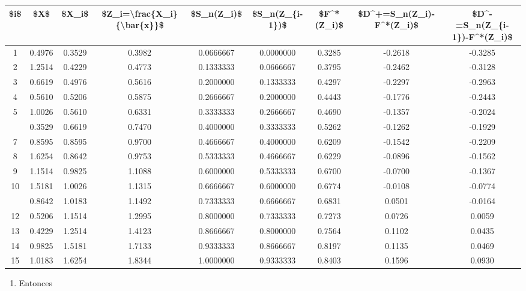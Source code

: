 \documentclass[
  a4paper,
  oneside,
  openany]{book}
\providecommand{\tightlist}{%
  \setlength{\itemsep}{0pt}\setlength{\parskip}{0pt}}
\begin{document}
\begin{table}
\centering
\begin{tabular}{ccccccccc}
\toprule
\$i\$ & \$X\$ & \$X\_i\$ & \$Z\_i=\textbackslash{}frac\{X\_i\}\{\textbackslash{}bar\{x\}\}\$ & \$S\_n(Z\_i)\$ & \$S\_n(Z\_\{i-1\})\$ & \$F\textasciicircum{}*(Z\_i)\$ & \$D\textasciicircum{}+=S\_n(Z\_i)-F\textasciicircum{}*(Z\_i)\$ & \$D\textasciicircum{}-=S\_n(Z\_\{i-1\})-F\textasciicircum{}*(Z\_i)\$\\
\midrule
1 & 0.4976 & 0.3529 & 0.3982 & 0.0666667 & 0.0000000 & 0.3285 & -0.2618 & -0.3285\\
2 & 1.2514 & 0.4229 & 0.4773 & 0.1333333 & 0.0666667 & 0.3795 & -0.2462 & -0.3128\\
3 & 0.6619 & 0.4976 & 0.5616 & 0.2000000 & 0.1333333 & 0.4297 & -0.2297 & -0.2963\\
4 & 0.5610 & 0.5206 & 0.5875 & 0.2666667 & 0.2000000 & 0.4443 & -0.1776 & -0.2443\\
5 & 1.0026 & 0.5610 & 0.6331 & 0.3333333 & 0.2666667 & 0.4690 & -0.1357 & -0.2024\\
\addlinespace
6 & 0.3529 & 0.6619 & 0.7470 & 0.4000000 & 0.3333333 & 0.5262 & -0.1262 & -0.1929\\
7 & 0.8595 & 0.8595 & 0.9700 & 0.4666667 & 0.4000000 & 0.6209 & -0.1542 & -0.2209\\
8 & 1.6254 & 0.8642 & 0.9753 & 0.5333333 & 0.4666667 & 0.6229 & -0.0896 & -0.1562\\
9 & 1.1514 & 0.9825 & 1.1088 & 0.6000000 & 0.5333333 & 0.6700 & -0.0700 & -0.1367\\
10 & 1.5181 & 1.0026 & 1.1315 & 0.6666667 & 0.6000000 & 0.6774 & -0.0108 & -0.0774\\
\addlinespace
11 & 0.8642 & 1.0183 & 1.1492 & 0.7333333 & 0.6666667 & 0.6831 & 0.0501 & -0.0164\\
12 & 0.5206 & 1.1514 & 1.2995 & 0.8000000 & 0.7333333 & 0.7273 & 0.0726 & 0.0059\\
13 & 0.4229 & 1.2514 & 1.4123 & 0.8666667 & 0.8000000 & 0.7564 & 0.1102 & 0.0435\\
14 & 0.9825 & 1.5181 & 1.7133 & 0.9333333 & 0.8666667 & 0.8197 & 0.1135 & 0.0469\\
15 & 1.0183 & 1.6254 & 1.8344 & 1.0000000 & 0.9333333 & 0.8403 & 0.1596 & 0.0930\\
\bottomrule
\end{tabular}
\end{table}

\begin{enumerate}
\def\labelenumi{\arabic{enumi})}
\setcounter{enumi}{8}
\tightlist
\item
  Entonces
\end{enumerate}
\end{document}
